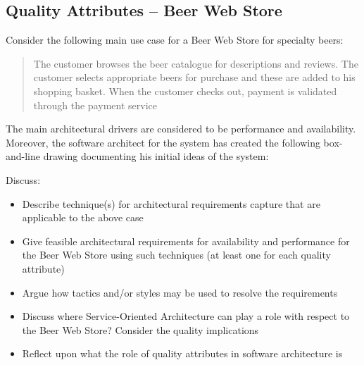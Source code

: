 \subsection{Quality Attributes -- Beer Web Store}

Consider the following main use case for a Beer Web Store for specialty
beers:

\begin{quote}
  The customer browses the beer catalogue for descriptions and
  reviews. The customer selects appropriate beers for purchase and
  these are added to his shopping basket. When the customer checks
  out, payment is validated through the payment service
\end{quote}
The main architectural drivers are considered to be performance and
availability. Moreover, the software architect for the system has
created the following box-and-line drawing documenting his initial
ideas of the system:
\begin{figure}[h!]
  \centerline{}
\end{figure}

Discuss:
\begin{itemize}
    \item Describe technique(s) for architectural requirements capture
    that are applicable to the above case
    \item Give feasible architectural requirements for availability
    and performance for the Beer Web Store using such techniques (at
    least one for each quality attribute)
    \item Argue how tactics and/or styles may be used to resolve the requirements
    \item Discuss where Service-Oriented Architecture can play a role
    with respect to the Beer Web Store? Consider the quality implications
    \item Reflect upon what the role of quality attributes in software
    architecture is
\end{itemize}
